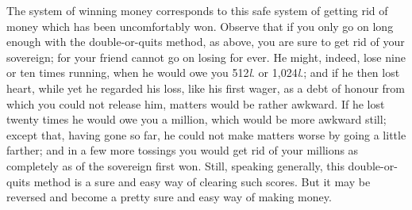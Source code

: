 \documentclass[letterpaper,12pt,oneside,openany]{memoir}
\begin{document}
The system of winning money corresponds to this
safe system of getting rid of money which has been
uncomfortably won. Observe that if you only go on
long enough with the double-or-quits method, as above,
you are sure to get rid of your sovereign; for your
friend cannot go on losing for ever. He might, indeed,
lose nine or ten times running, when he would owe you
512\textit{l}. or 1,024\textit{l}.; and if he then lost heart, while yet he
regarded his loss, like his first wager, as a debt of honour
from which you could not release him, matters would
be rather awkward. If he lost twenty times he would
owe you a million, which would be more awkward still;
except that, having gone so far, he could not make
matters worse by going a little farther; and in a few
more tossings you would get rid of your millions as
completely as of the sovereign first won. Still, speaking
generally, this double-or-quits method is a sure and
easy way of clearing such scores. But it may be reversed
and become a pretty sure and easy way of making
money.
\end{document}
